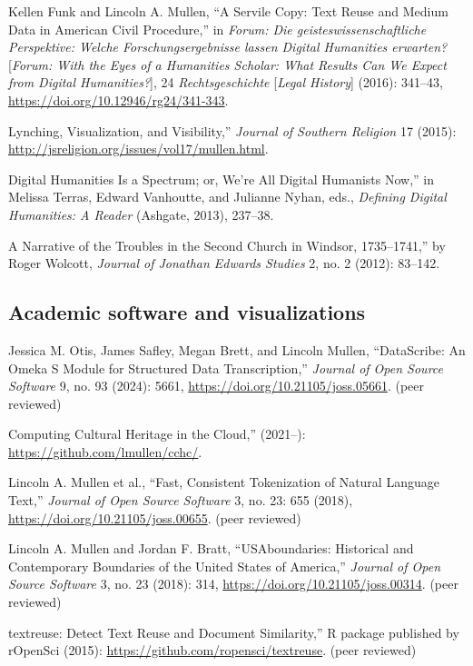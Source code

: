 \documentclass[11pt]{article}
\begin{document}
Kellen Funk and Lincoln A. Mullen, ``A Servile Copy: Text Reuse and Medium Data in American Civil Procedure,'' in \emph{Forum: Die geisteswissenschaftliche Perspektive: Welche Forschungsergebnisse lassen Digital Humanities erwarten?} [\emph{Forum: With the Eyes of a Humanities Scholar: What Results Can We Expect from Digital Humanities?}], 24 \emph{Rechtsgeschichte} [\emph{Legal History}] (2016): 341--43, \url{https://doi.org/10.12946/rg24/341-343}.

\noindent{}Lynching, Visualization, and Visibility,'' \emph{Journal of Southern Religion} 17 (2015): \url{http://jsreligion.org/issues/vol17/mullen.html}.

\noindent{}Digital Humanities Is a Spectrum; or, We're All Digital Humanists Now,'' in Melissa Terras, Edward Vanhoutte, and Julianne Nyhan, eds., \emph{Defining Digital Humanities: A Reader} (Ashgate, 2013), 237--38.

\noindent{}A Narrative of the Troubles in the Second Church in Windsor, 1735--1741,'' by Roger Wolcott, \emph{Journal of Jonathan Edwards Studies} 2, no. 2 (2012): 83--142.

\subsection{Academic software and visualizations}\label{Academic software}

Jessica M. Otis, James Safley, Megan Brett, and Lincoln Mullen, ``DataScribe: An Omeka S Module for 
Structured Data Transcription,'' \emph{Journal of Open Source Software} 9, no. 93 
(2024): 5661, \url{https://doi.org/10.21105/joss.05661}. (peer reviewed)

\noindent{}Computing Cultural Heritage in the Cloud,'' (2021--): \url{https://github.com/lmullen/cchc/}.

Lincoln A. Mullen et al., ``Fast, Consistent Tokenization of Natural Language Text,'' \emph{Journal of Open Source Software} 3, no. 23: 655 (2018), \url{https://doi.org/10.21105/joss.00655}. (peer reviewed)

Lincoln A. Mullen and Jordan F. Bratt, ``USAboundaries: Historical and Contemporary Boundaries of the United States of America,'' \emph{Journal of Open Source Software} 3, no. 23 (2018): 314, \url{https://doi.org/10.21105/joss.00314}. (peer reviewed)

\noindent{}textreuse: Detect Text Reuse and Document Similarity,'' R package published by rOpenSci (2015): \url{https://github.com/ropensci/textreuse}. (peer reviewed)
\end{document}
